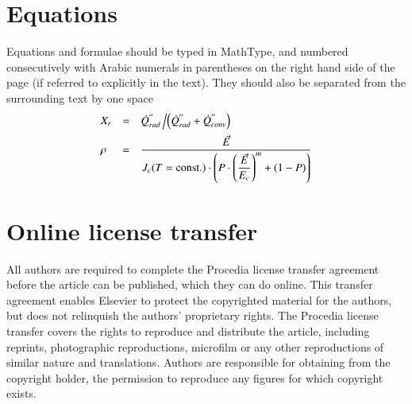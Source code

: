 \documentclass[5p,times,procedia]{elsarticle}
\begin{document}
\section{Equations}
Equations and formulae should be typed in MathType, and numbered consecutively with Arabic numerals in parentheses on the right hand side of the page (if referred to explicitly in the text). They should also be separated from the surrounding text by one space
\begin{equation}
\begin{array}{lcl}
\displaystyle X_r &=& \displaystyle\dot{Q}^{''}_{rad}\left/\left(\dot{Q}^{''}_{rad} + \dot{Q}^{''}_{conv}\right)\right.\\[6pt]
\displaystyle \rho &=& \displaystyle\frac{\vec{E}}{J_c(T={\rm const.})\cdot\left(P\cdot\left(\displaystyle\frac{\vec{E}}{E_c}\right)^m+(1-P)\right)}
\end{array}
\end{equation}


\section{Online license transfer}
All authors are required to complete the Procedia license transfer agreement before the article can be published, which they can do online. This transfer agreement enables Elsevier to protect the copyrighted material for the authors, but does not relinquish the authors’ proprietary rights. The Procedia license transfer covers the rights to reproduce and distribute the article, including reprints, photographic reproductions, microfilm or any other reproductions of similar nature and translations. Authors are responsible for obtaining from the copyright holder, the permission to reproduce any figures for which copyright exists.



\vfill\pagebreak
\end{document}
